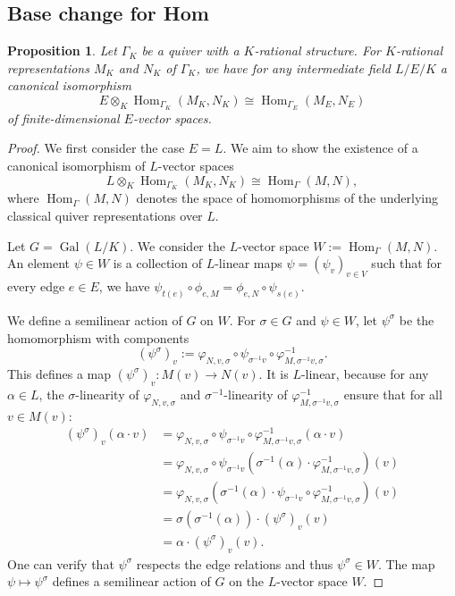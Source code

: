 \documentclass[a4paper,12pt,reqno]{amsart}
\DeclareMathOperator{\Hom}{\mathrm{Hom}}
\DeclareMathOperator{\Gal}{\mathrm {Gal}}
\theoremstyle{plain}
\newtheorem{proposition}[theorem]{Proposition}
\theoremstyle{remark}
\begin{document}
\subsection{Base change for Hom}

  \begin{proposition}\label{prop:homdescent}
    Let $\Gamma_K$ be a quiver with a $K$-rational structure. For $K$-rational representations $M_K$ and $N_K$ of $\Gamma_K$, we have for any intermediate field $L/E/K$ a canonical isomorphism
    \begin{equation}
      E\otimes_K\Hom_{\Gamma_K}(M_K,N_K) \cong \Hom_{\Gamma_E}(M_E,N_E)
    \end{equation}
    of finite-dimensional $E$-vector spaces.
  \end{proposition}

  \begin{proof}
    We first consider the case $E=L$. We aim to show the existence of a canonical isomorphism of $L$-vector spaces
    \[
    L\otimes_K\Hom_{\Gamma_K}(M_K,N_K) \cong \Hom_{\Gamma}(M, N),
    \]
    where $\Hom_{\Gamma}(M, N)$ denotes the space of homomorphisms of the underlying classical quiver representations over $L$.
    
    Let $G = \Gal(L/K)$. We consider the $L$-vector space $W := \Hom_{\Gamma}(M, N)$. An element $\psi \in W$ is a collection of $L$-linear maps $\psi = (\psi_v)_{v\in V}$ such that for every edge $e \in E$, we have $\psi_{t(e)}\circ \phi_{e,M} = \phi_{e,N}\circ\psi_{s(e)}$.
    
    We define a semilinear action of $G$ on $W$. For $\sigma \in G$ and $\psi \in W$, let $\psi^\sigma$ be the homomorphism with components
    \[
    (\psi^\sigma)_v := \varphi_{N,v,\sigma} \circ \psi_{\sigma^{-1}v} \circ \varphi_{M,\sigma^{-1}v,\sigma}^{-1}.
    \]
    This defines a map $(\psi^\sigma)_v\colon M(v) \to N(v)$. It is $L$-linear, because for any $\alpha \in L$, the $\sigma$-linearity of $\varphi_{N,v,\sigma}$ and $\sigma^{-1}$-linearity of $\varphi_{M,\sigma^{-1}v,\sigma}^{-1}$ ensure that for all $v\in M(v)$:
    \begin{align*}
      (\psi^\sigma)_v(\alpha\cdot v) &= \varphi_{N,v,\sigma} \circ \psi_{\sigma^{-1}v} \circ \varphi_{M,\sigma^{-1}v,\sigma}^{-1}(\alpha\cdot v) \\
      &= \varphi_{N,v,\sigma} \circ \psi_{\sigma^{-1}v} (\sigma^{-1}(\alpha)\cdot\varphi_{M,\sigma^{-1}v,\sigma}^{-1})(v) \\
      &= \varphi_{N,v,\sigma} (\sigma^{-1}(\alpha)\cdot\psi_{\sigma^{-1}v} \circ \varphi_{M,\sigma^{-1}v,\sigma}^{-1})(v) \\
      &= \sigma(\sigma^{-1}(\alpha)) \cdot (\psi^\sigma)_v(v)\\
      &= \alpha \cdot (\psi^\sigma)_v(v).
    \end{align*}
    One can verify that $\psi^\sigma$ respects the edge relations and thus $\psi^\sigma \in W$. The map $\psi \mapsto \psi^\sigma$ defines a semilinear action of $G$ on the $L$-vector space $W$.
    

\end{proof}
\end{document}
